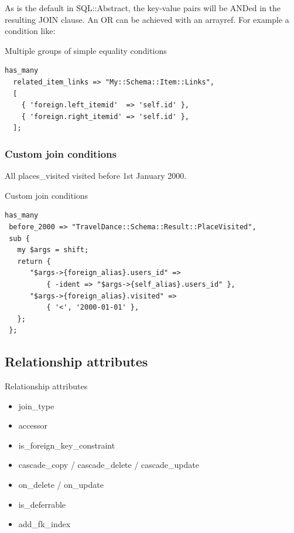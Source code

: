 As is the default in SQL::Abstract, the key-value pairs will be ANDed in the
resulting JOIN clause. An OR can be achieved with an arrayref. For example a
condition like:

\begin{frame}[fragile]{Multiple groups of simple equality conditions}
\begin{lstlisting}
has_many
  related_item_links => "My::Schema::Item::Links",
  [
    { 'foreign.left_itemid'  => 'self.id' },
    { 'foreign.right_itemid' => 'self.id' },
  ];
\end{lstlisting}
\end{frame}

\subsubsection{Custom join conditions}

All places\_visited visited before 1st January 2000.

\begin{frame}[fragile]{Custom join conditions}
\begin{lstlisting}
has_many
 before_2000 => "TravelDance::Schema::Result::PlaceVisited",
 sub {
   my $args = shift;
   return {
      "$args->{foreign_alias}.users_id" =>
          { -ident => "$args->{self_alias}.users_id" },
      "$args->{foreign_alias}.visited" =>
          { '<', '2000-01-01' },
   };
 };
\end{lstlisting}
\end{frame}

\subsection{Relationship attributes}


\begin{frame}{Relationship attributes}
\begin{itemize}
\item join\_type
\item accessor
\item is\_foreign\_key\_constraint
\item cascade\_copy / cascade\_delete / cascade\_update
\item on\_delete / on\_update
\item is\_deferrable
\item add\_fk\_index
\end{itemize}
\end{frame}

